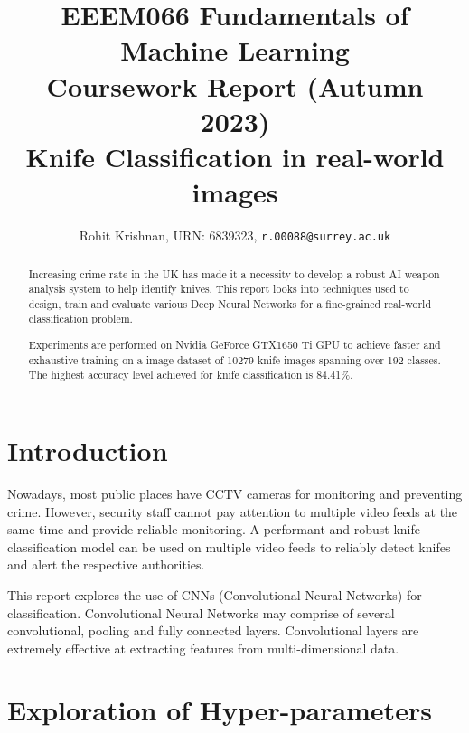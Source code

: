 \documentclass[10pt,twocolumn,letterpaper]{article}
\begin{document}
\title{EEEM066 Fundamentals of Machine Learning \\ Coursework Report (Autumn 2023) \\ Knife Classification in real-world images}

\author{Rohit Krishnan, {URN: 6839323},
  {\tt r.00088@surrey.ac.uk}
}
\maketitle

\begin{abstract}
  Increasing crime rate in the UK has made it a necessity to develop a robust AI weapon analysis system to help
  identify knives. This report looks into techniques used to design, train and evaluate various Deep Neural Networks
  for a fine-grained real-world classification problem.

  Experiments are performed on Nvidia GeForce GTX1650 Ti GPU to achieve faster and exhaustive training on a image
  dataset of 10279 knife images spanning over 192 classes. The highest accuracy level achieved for knife classification
  is 84.41\%.
\end{abstract}

\section{Introduction}
\label{sec:intro}

Nowadays, most public places have CCTV cameras for monitoring and preventing crime. However, security staff
cannot pay attention to multiple video feeds at the same time and provide reliable monitoring. A performant and
robust knife classification model can be used on multiple video feeds to reliably detect knifes and alert the
respective authorities.

This report explores the use of CNNs (Convolutional Neural Networks) \cite{oshea2015introduction} for classification.
Convolutional Neural Networks may comprise of several convolutional, pooling and fully connected layers. Convolutional layers are extremely effective
at extracting features from multi-dimensional data.


\section{Exploration of Hyper-parameters}
\label{sec:exp_hyper_params}
\end{document}

